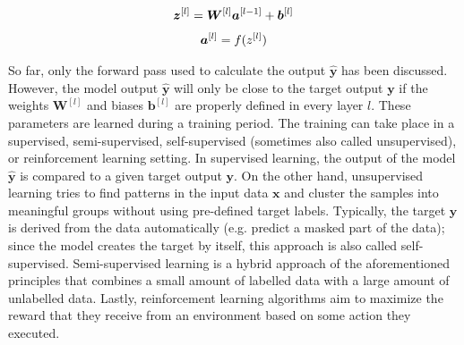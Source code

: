 \begin{align}\eqlbl{mlp}
		\boldsymbol{z}^{[l]} = \boldsymbol{W}^{[l]}\boldsymbol{a}^{[l-1]} + \boldsymbol{b}^{[l]}
\end{align}
\begin{align}\eqlbl{mlp2}
		\boldsymbol{a}^{[l]} = f({z}^{[l]})
\end{align}

So far, only the forward pass used to calculate the output $\boldsymbol{\hat{y}}$ has been discussed.
However, the model output $\boldsymbol{\hat{y}}$ will only be close to the target output $\boldsymbol{y}$ if the weights $\boldsymbol{W}^{[l]}$ and biases $\boldsymbol{b}^{[l]}$ are properly defined in every layer $l$.
These parameters are learned during a training period.
The training can take place in a supervised, semi-supervised, self-supervised (sometimes also called unsupervised), or reinforcement learning setting.
In supervised learning, the output of the model $\boldsymbol{\hat{y}}$ is compared to a given target output $\boldsymbol{y}$.
On the other hand, unsupervised learning tries to find patterns in the input data $\boldsymbol{x}$ and cluster the samples into meaningful groups without using pre-defined target labels. Typically, the target $\boldsymbol{y}$ is derived from the data automatically (e.g. predict a masked part of the data); since the model creates the target by itself, this approach is also called self-supervised.
Semi-supervised learning is a hybrid approach of the aforementioned principles that combines a small amount of labelled data with a large amount of unlabelled data.
Lastly, reinforcement learning algorithms aim to maximize the reward that they receive from an environment based on some action they executed.

